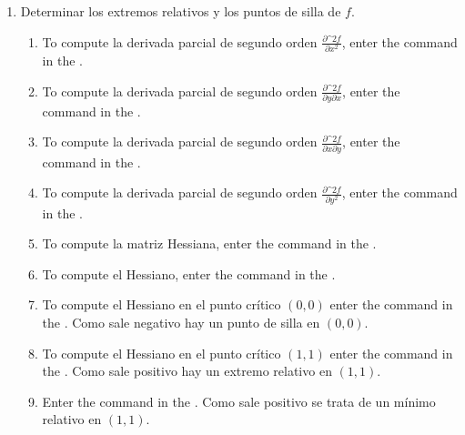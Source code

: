 \begin{enumerate}[leftmargin=*]
\begin{enumerate}
      \item Determinar los extremos relativos y los puntos de silla de $f$.
            \begin{indication}
            \begin{enumerate}
            \item To compute la derivada parcial de segundo orden $\frac{\partial\^2 f}{\partial x^2}$, enter the command  in the .
            \item To compute la derivada parcial de segundo orden $\frac{\partial\^2 f}{\partial y\partial x}$, enter the command  in the .
            \item To compute la derivada parcial de segundo orden $\frac{\partial\^2 f}{\partial x\partial y}$, enter the command  in the .
            \item To compute la derivada parcial de segundo orden $\frac{\partial\^2 f}{\partial y^2}$, enter the command  in the .
            \item To compute la matriz Hessiana, enter the command  in the .
            \item To compute el Hessiano, enter the command  in the .
            \item To compute el Hessiano en el punto crítico $(0,0)$ enter the command  in the . Como sale negativo hay un punto de silla en $(0,0)$.
            \item To compute el Hessiano en el punto crítico $(1,1)$ enter the command  in the . Como sale positivo hay un extremo relativo en $(1,1)$.
            \item Enter the command  in the . Como sale positivo se trata de un mínimo relativo en $(1,1)$.
            \end{enumerate}
            \end{indication}
      \end{enumerate}

\end{enumerate}


